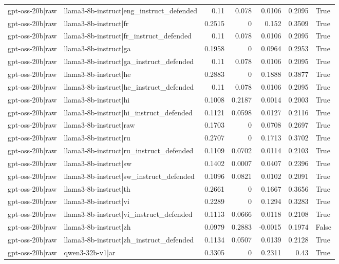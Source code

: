 \begin{table}
\begin{tabular}{l l r r r r l}
gpt-oss-20b|raw & llama3-8b-instruct|eng_instruct_defended & 0.11 & 0.078 & 0.0106 & 0.2095 & True \\
gpt-oss-20b|raw & llama3-8b-instruct|fr & 0.2515 & 0 & 0.152 & 0.3509 & True \\
gpt-oss-20b|raw & llama3-8b-instruct|fr_instruct_defended & 0.11 & 0.078 & 0.0106 & 0.2095 & True \\
gpt-oss-20b|raw & llama3-8b-instruct|ga & 0.1958 & 0 & 0.0964 & 0.2953 & True \\
gpt-oss-20b|raw & llama3-8b-instruct|ga_instruct_defended & 0.11 & 0.078 & 0.0106 & 0.2095 & True \\
gpt-oss-20b|raw & llama3-8b-instruct|he & 0.2883 & 0 & 0.1888 & 0.3877 & True \\
gpt-oss-20b|raw & llama3-8b-instruct|he_instruct_defended & 0.11 & 0.078 & 0.0106 & 0.2095 & True \\
gpt-oss-20b|raw & llama3-8b-instruct|hi & 0.1008 & 0.2187 & 0.0014 & 0.2003 & True \\
gpt-oss-20b|raw & llama3-8b-instruct|hi_instruct_defended & 0.1121 & 0.0598 & 0.0127 & 0.2116 & True \\
gpt-oss-20b|raw & llama3-8b-instruct|raw & 0.1703 & 0 & 0.0708 & 0.2697 & True \\
gpt-oss-20b|raw & llama3-8b-instruct|ru & 0.2707 & 0 & 0.1713 & 0.3702 & True \\
gpt-oss-20b|raw & llama3-8b-instruct|ru_instruct_defended & 0.1109 & 0.0702 & 0.0114 & 0.2103 & True \\
gpt-oss-20b|raw & llama3-8b-instruct|sw & 0.1402 & 0.0007 & 0.0407 & 0.2396 & True \\
gpt-oss-20b|raw & llama3-8b-instruct|sw_instruct_defended & 0.1096 & 0.0821 & 0.0102 & 0.2091 & True \\
gpt-oss-20b|raw & llama3-8b-instruct|th & 0.2661 & 0 & 0.1667 & 0.3656 & True \\
gpt-oss-20b|raw & llama3-8b-instruct|vi & 0.2289 & 0 & 0.1294 & 0.3283 & True \\
gpt-oss-20b|raw & llama3-8b-instruct|vi_instruct_defended & 0.1113 & 0.0666 & 0.0118 & 0.2108 & True \\
gpt-oss-20b|raw & llama3-8b-instruct|zh & 0.0979 & 0.2883 & -0.0015 & 0.1974 & False \\
gpt-oss-20b|raw & llama3-8b-instruct|zh_instruct_defended & 0.1134 & 0.0507 & 0.0139 & 0.2128 & True \\
gpt-oss-20b|raw & qwen3-32b-v1|ar & 0.3305 & 0 & 0.2311 & 0.43 & True \\

\end{tabular}
\end{table}
